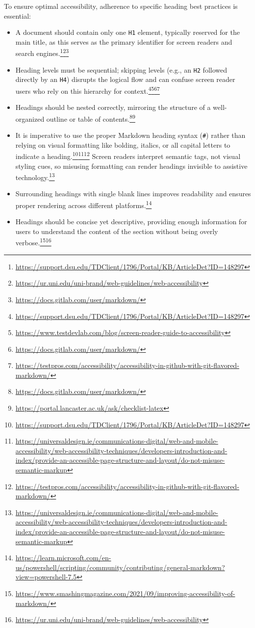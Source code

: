 To ensure optimal accessibility, adherence to specific heading best practices is essential:
\begin{itemize}[noitemsep,topsep=0pt]
    \item A document should contain only one \texttt{H1} element, typically reserved for the main title, as this serves as the primary identifier for screen readers and search engines.\footnote{\url{https://support.dsu.edu/TDClient/1796/Portal/KB/ArticleDet?ID=148297}}\footnote{\url{https://ur.uni.edu/uni-brand/web-guidelines/web-accessibility}}\footnote{\url{https://docs.gitlab.com/user/markdown/}}
    \item Heading levels must be sequential; skipping levels (e.g., an \texttt{H2} followed directly by an \texttt{H4}) disrupts the logical flow and can confuse screen reader users who rely on this hierarchy for context.\footnote{\url{https://support.dsu.edu/TDClient/1796/Portal/KB/ArticleDet?ID=148297}}\footnote{\url{https://www.testdevlab.com/blog/screen-reader-guide-to-accessibility}}\footnote{\url{https://docs.gitlab.com/user/markdown/}}\footnote{\url{https://testpros.com/accessibility/accessibility-in-github-with-git-flavored-markdown/}}
    \item Headings should be nested correctly, mirroring the structure of a well-organized outline or table of contents.\footnote{\url{https://docs.gitlab.com/user/markdown/}}\footnote{\url{https://portal.lancaster.ac.uk/ask/checklist-latex}}
    \item It is imperative to use the proper Markdown heading syntax (\texttt{\#}) rather than relying on visual formatting like bolding, italics, or all capital letters to indicate a heading.\footnote{\url{https://support.dsu.edu/TDClient/1796/Portal/KB/ArticleDet?ID=148297}}\footnote{\url{https://universaldesign.ie/communications-digital/web-and-mobile-accessibility/web-accessibility-techniques/developers-introduction-and-index/provide-an-accessible-page-structure-and-layout/do-not-misuse-semantic-markup}}\footnote{\url{https://testpros.com/accessibility/accessibility-in-github-with-git-flavored-markdown/}} Screen readers interpret semantic tags, not visual styling cues, so misusing formatting can render headings invisible to assistive technology.\footnote{\url{https://universaldesign.ie/communications-digital/web-and-mobile-accessibility/web-accessibility-techniques/developers-introduction-and-index/provide-an-accessible-page-structure-and-layout/do-not-misuse-semantic-markup}}
    \item Surrounding headings with single blank lines improves readability and ensures proper rendering across different platforms.\footnote{\url{https://learn.microsoft.com/en-us/powershell/scripting/community/contributing/general-markdown?view=powershell-7.5}}
    \item Headings should be concise yet descriptive, providing enough information for users to understand the content of the section without being overly verbose.\footnote{\url{https://www.smashingmagazine.com/2021/09/improving-accessibility-of-markdown/}}\footnote{\url{https://ur.uni.edu/uni-brand/web-guidelines/web-accessibility}}
\end{itemize}
